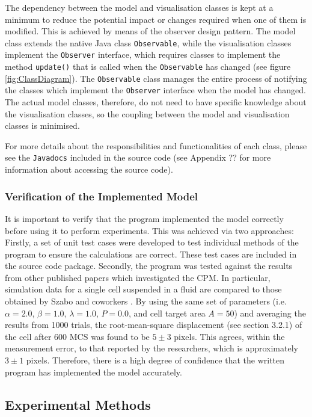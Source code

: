 \documentclass[a4paper,12pt]{article}
\begin{document}
The dependency between the model and visualisation classes is kept at a minimum to reduce the potential impact or changes required when one of them is modified. This is achieved by means of the observer design pattern. The model class extends the native Java class \texttt{Observable}, while the visualisation classes implement the \texttt{Observer} interface, which requires classes to implement the method \texttt{update()} that is called when the \texttt{Observable} has changed (see figure \ref{fig:ClassDiagram}). The \texttt{Observable} class manages the entire process of notifying the classes which implement the \texttt{Observer} interface when the model has changed. The actual model classes, therefore, do not need to have specific knowledge about the visualisation classes, so the coupling between the model and visualisation classes is minimised.

For more details about the responsibilities and functionalities of each class, please see the \texttt{Javadocs} included in the source code (see Appendix ?? for more information about accessing the source code). 



\subsubsection{Verification of the Implemented Model}
It is important to verify that the program implemented the model correctly before using it to perform experiments. This was achieved via two approaches: Firstly, a set of unit test cases were developed to test individual methods of the program to ensure the calculations are correct. These test cases are included in the source code package. Secondly, the program was tested against the results from other published papers which investigated the CPM. In particular, simulation data for a single cell suspended in a fluid are compared to those obtained by Szabo and coworkers \cite{szabo2010}. By using the same set of parameters (i.e. $\alpha = 2.0$, $\beta = 1.0$, $\lambda = 1.0$, $P = 0.0$, and cell target area $A = 50$) and averaging the results from 1000 trials, the root-mean-square displacement (see section 3.2.1) of the cell after 600 MCS was found to be $5 \pm 3$ pixels. This agrees, within the measurement error, to that reported by the researchers, which is approximately $3 \pm 1$ pixels. Therefore, there is a high degree of confidence that the written program has implemented the model accurately.


\subsection{Experimental Methods}
\end{document}

